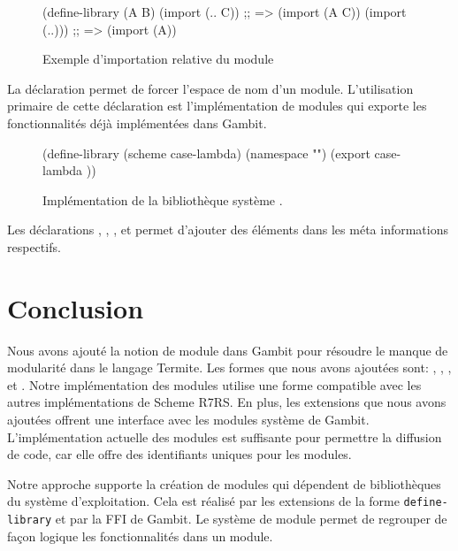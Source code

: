 \begin{figure}[ht]
  \centering
  \fontsize{12}{10}
  \begin{mplisting}{0.8}
(define-library (A B)
  (import (.. C))  ;; => (import (A C))
  (import (..))) ;; => (import (A))
\end{mplisting}
  \caption{Exemple d'importation relative du module}
  \label{fig:relative-import}
\end{figure}

La déclaration  permet de forcer l'espace de nom d'un module.
L'utilisation primaire de cette déclaration est l'implémentation de modules qui
exporte les fonctionnalités déjà implémentées dans Gambit. \\

\begin{figure}[ht]
  \fontsize{12}{10}
  \begin{mplisting}{0.8}
(define-library (scheme case-lambda)
  (namespace "")
  (export
case-lambda
))
\end{mplisting}
  \caption{Implémentation de la bibliothèque système .}
  \label{fig:module->scheme/case-lambda}
\end{figure}

Les déclarations , , ,
 et  permet d'ajouter des éléments dans les
méta informations respectifs.

\section{Conclusion}

Nous avons ajouté la notion de module dans Gambit pour résoudre le manque de
modularité dans le langage Termite.  Les formes que nous avons ajoutées sont:
, , ,
 et .  Notre implémentation des modules
utilise une forme compatible avec les autres implémentations de Scheme R7RS. En
plus, les extensions que nous avons ajoutées offrent une interface avec les
modules système de Gambit. L'implémentation actuelle des modules est suffisante
pour permettre la diffusion de code, car elle offre des identifiants uniques
pour les modules.

Notre approche supporte la création de modules qui dépendent de bibliothèques
du système d'exploitation.  Cela est réalisé par les extensions de la forme
\texttt{define-library} et par la FFI de Gambit. Le système de module permet
de regrouper de façon logique les fonctionnalités dans un module.
